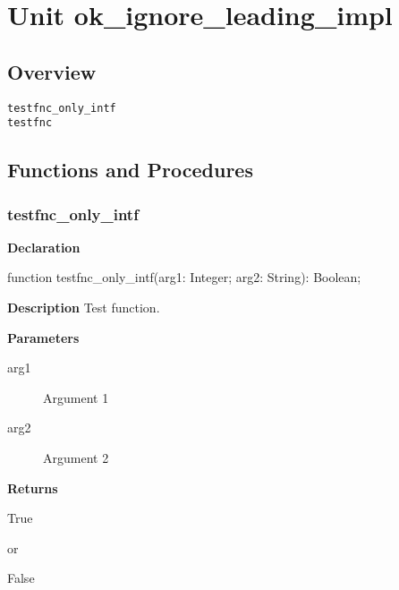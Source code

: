 \documentclass{report}
\begin{document}
\newlength{\tmplength}
\chapter{Unit ok{\_}ignore{\_}leading{\_}impl}
\section{Overview}
\begin{description}
\item[\texttt{testfnc{\_}only{\_}intf}]
\item[\texttt{testfnc}]
\end{description}
\section{Functions and Procedures}
\subsection*{testfnc{\_}only{\_}intf}
\begin{list}{}{
\setlength{\itemindent}{0cm}
\setlength{\listparindent}{0cm}
\setlength{\leftmargin}{\evensidemargin}
\addtolength{\leftmargin}{\tmplength}
\settowidth{\labelsep}{X}
\addtolength{\leftmargin}{\labelsep}
\setlength{\labelwidth}{\tmplength}
}
\begin{flushleft}
\item[\textbf{Declaration}\hfill]
\begin{ttfamily}
function testfnc{\_}only{\_}intf(arg1: Integer; arg2: String): Boolean;\end{ttfamily}


\end{flushleft}
\par
\item[\textbf{Description}]
Test function.

  \par
\item[\textbf{Parameters}]
\begin{description}
\item[arg1] Argument 1
\item[arg2] Argument 2
\end{description}
\item[\textbf{Returns}]\begin{ttfamily}True\end{ttfamily} or \begin{ttfamily}False\end{ttfamily}


\end{list}
\end{document}
